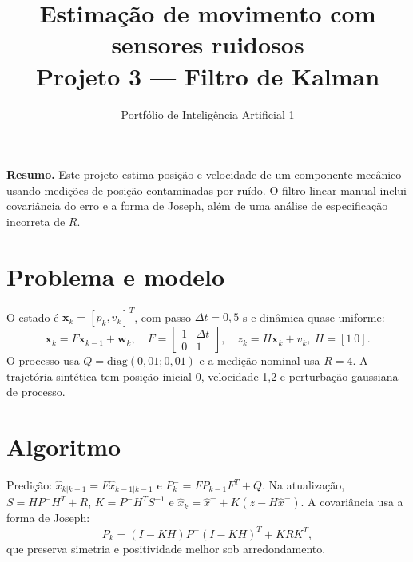 \documentclass[10pt,a4paper]{article}
\title{\vspace{-1em}\textbf{Estimação de movimento com sensores ruidosos}\\\large Projeto 3 — Filtro de Kalman}
\author{Portfólio de Inteligência Artificial 1}\date{}
\begin{document}
\maketitle\vspace{-1em}
\textbf{Resumo.} Este projeto estima posição e velocidade de um componente mecânico usando medições de posição contaminadas por ruído. O filtro linear manual inclui covariância do erro e a forma de Joseph, além de uma análise de especificação incorreta de $R$.
\section{Problema e modelo}
O estado é $\mathbf{x}_k=[p_k,v_k]^T$, com passo $\Delta t=0,5$ s e dinâmica quase uniforme:
\[
\mathbf{x}_k=F\mathbf{x}_{k-1}+\mathbf{w}_k,\quad
F=\begin{bmatrix}1&\Delta t\\0&1\end{bmatrix},\quad
z_k=H\mathbf{x}_k+v_k,\ H=[1\ 0].
\]
O processo usa $Q=\mathrm{diag}(0,01;0,01)$ e a medição nominal usa $R=4$. A trajetória sintética tem posição inicial 0, velocidade 1,2 e perturbação gaussiana de processo.
\section{Algoritmo}
Predição: $\hat{x}_{k|k-1}=F\hat{x}_{k-1|k-1}$ e $P^-_k=FP_{k-1}F^T+Q$. Na atualização, $S=HP^-H^T+R$, $K=P^-H^TS^{-1}$ e $\hat{x}_k=\hat{x}^-+K(z-H\hat{x}^-)$. A covariância usa a forma de Joseph:
\[
P_k=(I-KH)P^-(I-KH)^T+KRK^T,
\]
que preserva simetria e positividade melhor sob arredondamento.
\end{document}
